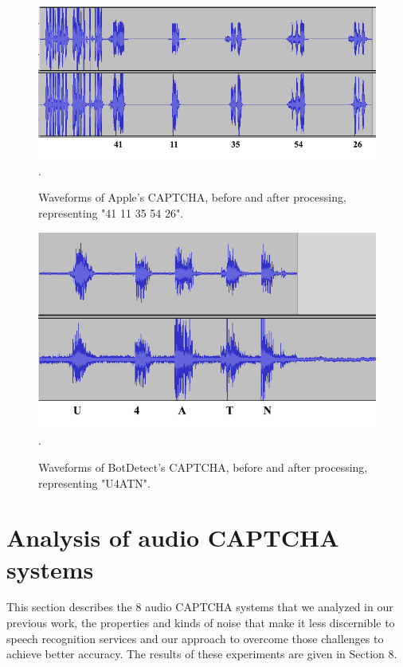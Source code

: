 \begin{figure}[t]
   \centering
   \includegraphics[width=\columnwidth]{figures/Apple1.jpg}.
   \caption{Waveforms of Apple's CAPTCHA, before and after processing, representing "41 11 35 54 26".}
   \label{fig:apple1}
\end{figure}
\begin{figure}[t]
   \centering
   \includegraphics[width=\columnwidth]{figures/BotDetect1.jpg}.
   \caption{Waveforms of BotDetect's CAPTCHA, before and after processing, representing "U4ATN".}
   \label{fig:botdetect1}
\end{figure}

\section{Analysis of audio CAPTCHA systems}
\label{sec:analysis}

This section describes the 8 audio CAPTCHA systems that we analyzed in our previous work, the properties and kinds of noise that make it less discernible to speech recognition services and our approach to overcome those challenges to achieve better accuracy. The results of these experiments are given in Section 8. \newline 

